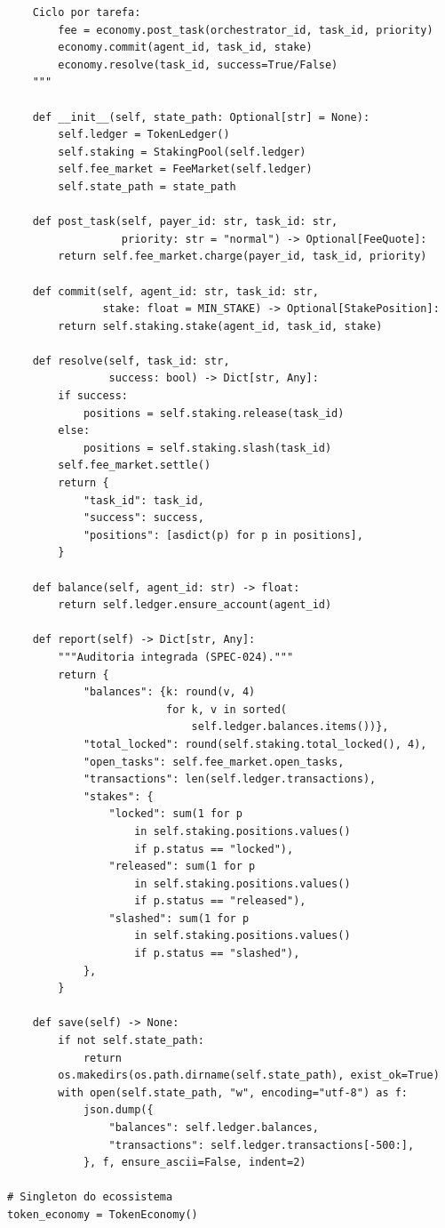 \begin{verbatim}
    Ciclo por tarefa:
        fee = economy.post_task(orchestrator_id, task_id, priority)
        economy.commit(agent_id, task_id, stake)
        economy.resolve(task_id, success=True/False)
    """

    def __init__(self, state_path: Optional[str] = None):
        self.ledger = TokenLedger()
        self.staking = StakingPool(self.ledger)
        self.fee_market = FeeMarket(self.ledger)
        self.state_path = state_path

    def post_task(self, payer_id: str, task_id: str,
                  priority: str = "normal") -> Optional[FeeQuote]:
        return self.fee_market.charge(payer_id, task_id, priority)

    def commit(self, agent_id: str, task_id: str,
               stake: float = MIN_STAKE) -> Optional[StakePosition]:
        return self.staking.stake(agent_id, task_id, stake)

    def resolve(self, task_id: str,
                success: bool) -> Dict[str, Any]:
        if success:
            positions = self.staking.release(task_id)
        else:
            positions = self.staking.slash(task_id)
        self.fee_market.settle()
        return {
            "task_id": task_id,
            "success": success,
            "positions": [asdict(p) for p in positions],
        }

    def balance(self, agent_id: str) -> float:
        return self.ledger.ensure_account(agent_id)

    def report(self) -> Dict[str, Any]:
        """Auditoria integrada (SPEC-024)."""
        return {
            "balances": {k: round(v, 4)
                         for k, v in sorted(
                             self.ledger.balances.items())},
            "total_locked": round(self.staking.total_locked(), 4),
            "open_tasks": self.fee_market.open_tasks,
            "transactions": len(self.ledger.transactions),
            "stakes": {
                "locked": sum(1 for p
                    in self.staking.positions.values()
                    if p.status == "locked"),
                "released": sum(1 for p
                    in self.staking.positions.values()
                    if p.status == "released"),
                "slashed": sum(1 for p
                    in self.staking.positions.values()
                    if p.status == "slashed"),
            },
        }

    def save(self) -> None:
        if not self.state_path:
            return
        os.makedirs(os.path.dirname(self.state_path), exist_ok=True)
        with open(self.state_path, "w", encoding="utf-8") as f:
            json.dump({
                "balances": self.ledger.balances,
                "transactions": self.ledger.transactions[-500:],
            }, f, ensure_ascii=False, indent=2)

# Singleton do ecossistema
token_economy = TokenEconomy()
\end{verbatim}

